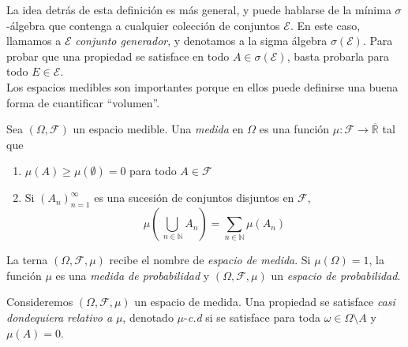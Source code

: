 \documentclass[main.tex]{subfiles}
\begin{document}
La idea detrás de esta definición es más general, y puede hablarse de la mínima $\sigma$-álgebra que contenga a cualquier colección de conjuntos $\mathcal{E}$. En este caso, llamamos a $\mathcal{E}$ \textit{conjunto generador}, y denotamos a la sigma álgebra $\sigma(\mathcal{E})$. Para probar que una propiedad se satisface en todo $A\in\sigma(\mathcal{E})$, basta probarla para todo $E\in\mathcal{E}$. \\

Los espacios medibles son importantes porque en ellos puede definirse una buena forma de cuantificar \enquote{volumen}. 

\begin{definition}
Sea $(\Omega, \mathcal{F})$ un espacio medible. Una \textit{medida} en $\Omega$ es una función $\mu: \mathcal{F} \to \overline{\mathbb{R}}$ tal que
\begin{enumerate}[label=\roman*.]
	\item $\mu(A)\geq \mu(\emptyset)=0$ para todo $A\in\mathcal{F}$
	\item Si $(A_n)_{n=1}^\infty$ es una sucesión de conjuntos disjuntos en $\mathcal{F}$, 
	\begin{equation*}
	\mu\left(\bigcup_{\ n\in\mathbb{N}}A_n\right)=
	\sum_{n\in\mathbb{N}}\mu(A_n)	
	\end{equation*}
\end{enumerate}
La terna $(\Omega, \mathcal{F}, \mu)$ recibe el nombre de \textit{espacio de medida}. Si $\mu(\Omega)=1$, la función $\mu$ es una \textit{medida de probabilidad} y $(\Omega, \mathcal{F}, \mu)$ un \textit{espacio de probabilidad}.
\end{definition} 

\begin{definition}
Consideremos $(\Omega, \mathcal{F}, \mu)$ un espacio de medida. Una propiedad se satisface \textit{casi dondequiera relativo a} $\mu$, denotado $\mu$-\textit{c.d} si se satisface para toda $\omega\in \Omega\setminus A$ y $\mu(A)=0$.
\end{definition}
\end{document}
